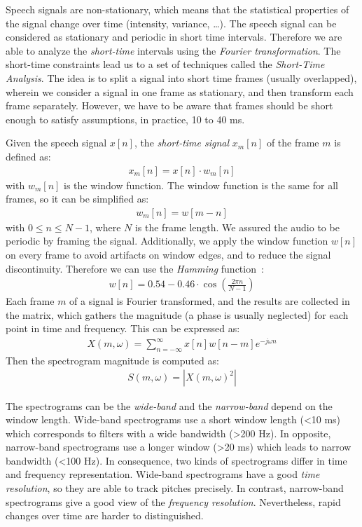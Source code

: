 Speech signals are non-stationary, which means that the statistical properties
of the signal change over time (intensity, variance, \ldots).
The speech signal can be considered as stationary and periodic in short time intervals.
Therefore we are able to analyze the \textit{short-time} intervals using the \textit{Fourier transformation}.
The short-time constraints lead us to a set of techniques called the \textit{Short-Time Analysis}.
The idea is to split a signal into short time frames (usually overlapped),
wherein we consider a signal in one frame as stationary, and then
transform each frame separately.
However, we have to be aware that frames should be short enough to satisfy assumptions, in practice, 10 to 40 ms.

Given the speech signal $x[n]$, the \textit{short-time signal} $x_m[n]$ of the frame $m$ is defined as:
\begin{align}
x_m [n] = x[n] \cdot w_m [n]
\end{align}
with $w_m[n]$ is the window function.
The window function is the same for all frames, so it can be simplified as:
\begin{align}
w_m [n] = w[m-n]
\end{align}
with $0 \leq n \leq N-1$, where $N$ is the frame length.
We assured the audio to be periodic by framing the signal.
Additionally, we apply the window function $w[n]$  on every frame to avoid
artifacts on window edges, and to reduce the signal discontinuity.
Therefore we can use the \textit{Hamming} function~\cite{harris1978}:
\begin{align}
w[n]=0.54-0.46 \cdot \cos(\frac{2 \pi n}{N-1})
\end{align}
Each frame $m$ of a signal is Fourier transformed, and the results are collected in the matrix,
which gathers the magnitude (a phase is usually neglected) for each point in time and frequency.
This can be expressed as:
\begin{align}
X(m, \omega)=\sum _{n=-\infty }^{\infty }x[n]w[n-m]e^{-j \omega n }
\end{align}
Then the spectrogram magnitude is computed as:
\begin{align}
S(m, \omega) = |X(m, \omega)^{2}|
\end{align}

The spectrograms can be the \textit{wide-band} and the \textit{narrow-band} depend on the window length.
Wide-band spectrograms use a short window length (<10 ms) which corresponds to
filters with a wide bandwidth (>200 Hz).
In opposite, narrow-band spectrograms use a longer window (>20 ms) which
leads to narrow bandwidth (<100 Hz).
In consequence, two kinds of spectrograms differ in time and frequency representation.
Wide-band spectrograms have a good \textit{time resolution}, so they are able to track pitches precisely.
In contrast, narrow-band spectrograms give a good view of the \textit{frequency resolution}.
Nevertheless, rapid changes over time are harder to distinguished.


